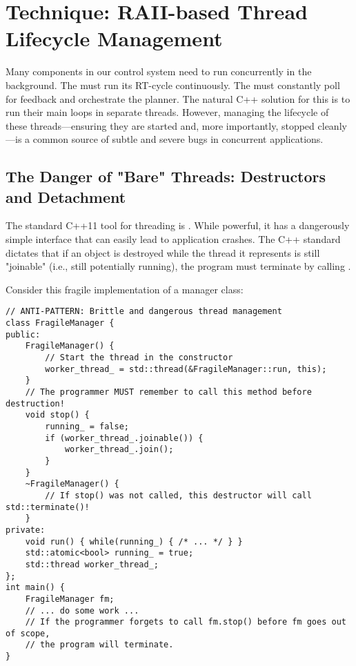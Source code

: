 
\section{Technique: RAII-based Thread Lifecycle Management}
\label{sec:technique-jthread}

Many components in our control system need to run concurrently in the background. The  must run its RT-cycle continuously. The  must constantly poll for feedback and orchestrate the planner. The natural C++ solution for this is to run their main loops in separate threads. However, managing the lifecycle of these threads—ensuring they are started and, more importantly, stopped cleanly—is a common source of subtle and severe bugs in concurrent applications.

\subsection{The Danger of "Bare" Threads: Destructors and Detachment}
\label{subsec:danger-std-thread}

The standard C++11 tool for threading is . While powerful, it has a dangerously simple interface that can easily lead to application crashes. The C++ standard dictates that if an  object is destroyed while the thread it represents is still "joinable" (i.e., still potentially running), the program must terminate by calling .

Consider this fragile implementation of a manager class:

\begin{verbatim}
// ANTI-PATTERN: Brittle and dangerous thread management
class FragileManager {
public:
    FragileManager() {
        // Start the thread in the constructor
        worker_thread_ = std::thread(&FragileManager::run, this);
    }
    // The programmer MUST remember to call this method before destruction!
    void stop() {
        running_ = false;
        if (worker_thread_.joinable()) {
            worker_thread_.join();
        }
    }
    ~FragileManager() {
        // If stop() was not called, this destructor will call std::terminate()!
    }
private:
    void run() { while(running_) { /* ... */ } }
    std::atomic<bool> running_ = true;
    std::thread worker_thread_;
};
int main() {
    FragileManager fm;
    // ... do some work ...
    // If the programmer forgets to call fm.stop() before fm goes out of scope,
    // the program will terminate.
}
\end{verbatim}
\label{lst:fragile-thread}


